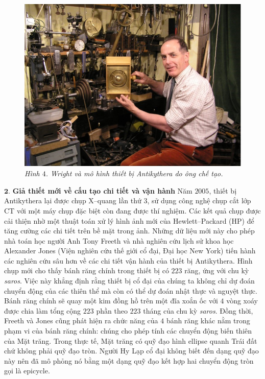 \begin{multicols}{2}
\begin{figure}[H]
		\includegraphics[width= 1\linewidth]{5}
		\caption{\small\textit{\color{lichsutoanhoc}Hình $4$. Wright và mô hình thiết bị Antikythera do ông chế tạo.}}
		\vspace*{-10pt}
	\end{figure}
	$\pmb{2.}$ \textbf{\color{lichsutoanhoc}Giả thiết mới về cấu tạo chi tiết và vận hành}
	\vskip 0.05cm
	Năm $2005$, thiết bị Antikythera lại được chụp X--quang lần thứ $3$, sử dụng công nghệ chụp cắt lớp CT với một máy chụp đặc biệt còn đang được thí nghiệm. Các kết quả chụp được cải thiện nhờ một thuật toán xử lý hình ảnh mới của Hewlett--Packard (HP) để tăng cường các chi tiết trên bề mặt trong ảnh. Những dữ liệu mới này cho phép nhà toán học người Anh Tony Freeth và nhà nghiên cứu lịch sử khoa học Alexander Jones (Viện nghiên cứu thế giới cổ đại, Đại học New York) tiến hành các nghiên cứu sâu hơn về các chi tiết vận hành của thiết bị Antikythera.
	\vskip 0.1cm
	Hình chụp mới cho thấy bánh răng chính trong thiết bị có $223$ răng, ứng với chu kỳ \textit{saros}. Việc này khẳng định rằng thiết bị cổ đại của chúng ta không chỉ dự đoán chuyển động của các thiên thể mà còn có thể dự đoán nhật thực và nguyệt thực. Bánh răng chính sẽ quay một kim đồng hồ trên một đĩa xoắn ốc với $4$ vòng xoáy được chia làm tổng cộng $223$ phần theo $223$ tháng của chu kỳ \textit{saros}. Đồng thời, Freeth và Jones cũng phát hiện ra chức năng của $4$ bánh răng khác nằm trong phạm vi của bánh răng chính: chúng cho phép tính các chuyển động biến thiên của Mặt trăng. Trong thực tế, Mặt trăng có quỹ đạo hình ellipse quanh Trái đất chứ không phải quỹ đạo tròn. Người Hy Lạp cổ đại không biết đến dạng quỹ đạo này nên đã mô phỏng nó bằng một dạng quỹ đạo kết hợp hai chuyển động tròn gọi là epicycle.

\end{multicols}
